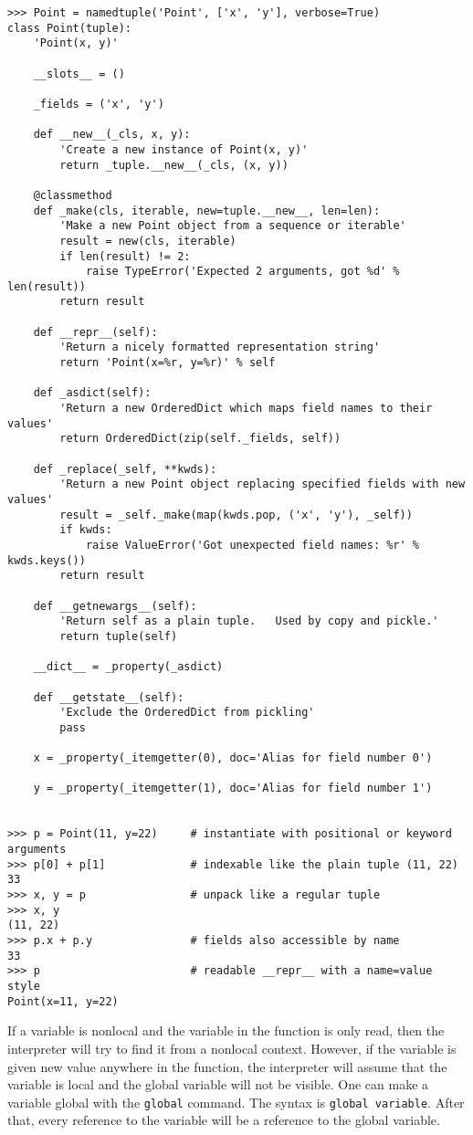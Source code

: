 \begin{verbatim}
>>> Point = namedtuple('Point', ['x', 'y'], verbose=True)
class Point(tuple):
    'Point(x, y)'

    __slots__ = ()

    _fields = ('x', 'y')

    def __new__(_cls, x, y):
        'Create a new instance of Point(x, y)'
        return _tuple.__new__(_cls, (x, y))

    @classmethod
    def _make(cls, iterable, new=tuple.__new__, len=len):
        'Make a new Point object from a sequence or iterable'
        result = new(cls, iterable)
        if len(result) != 2:
            raise TypeError('Expected 2 arguments, got %d' % len(result))
        return result

    def __repr__(self):
        'Return a nicely formatted representation string'
        return 'Point(x=%r, y=%r)' % self

    def _asdict(self):
        'Return a new OrderedDict which maps field names to their values'
        return OrderedDict(zip(self._fields, self))

    def _replace(_self, **kwds):
        'Return a new Point object replacing specified fields with new values'
        result = _self._make(map(kwds.pop, ('x', 'y'), _self))
        if kwds:
            raise ValueError('Got unexpected field names: %r' % kwds.keys())
        return result

    def __getnewargs__(self):
        'Return self as a plain tuple.   Used by copy and pickle.'
        return tuple(self)

    __dict__ = _property(_asdict)

    def __getstate__(self):
        'Exclude the OrderedDict from pickling'
        pass

    x = _property(_itemgetter(0), doc='Alias for field number 0')

    y = _property(_itemgetter(1), doc='Alias for field number 1')


>>> p = Point(11, y=22)     # instantiate with positional or keyword arguments
>>> p[0] + p[1]             # indexable like the plain tuple (11, 22)
33
>>> x, y = p                # unpack like a regular tuple
>>> x, y
(11, 22)
>>> p.x + p.y               # fields also accessible by name
33
>>> p                       # readable __repr__ with a name=value style
Point(x=11, y=22)
\end{verbatim}

If a variable is nonlocal and the variable in the function is only read, then the interpreter will try to find it from a nonlocal context. However, if the variable is given new value anywhere in the function, the interpreter will assume that the variable is local and the global variable will not be visible. One can make a variable global with the \texttt{global} command. The syntax is \texttt{global variable}. After that, every reference to the variable will be a reference to the global variable.

